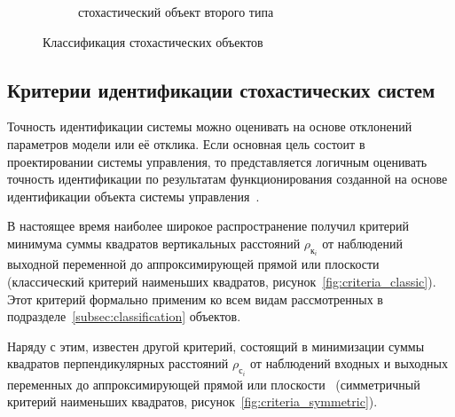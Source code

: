 \begin{figure}[p]
  \vspace{2\baselineskip}
  \begin{subfigure}[b]{\linewidth}
    \centering
    \caption{стохастический объект второго типа}\label{fig:type_second}
  \end{subfigure}

  \vspace{\baselineskip}
  \caption{Классификация стохастических объектов}
\end{figure}

\subsection{Критерии идентификации стохастических систем}

Точность идентификации системы можно оценивать на основе отклонений параметров модели или её отклика.
Если основная цель состоит в проектировании системы управления, то представляется логичным
оценивать точность идентификации по результатам функционирования созданной на основе идентификации
объекта системы управления~\cite{eikhoff_1975}.

В настоящее время наиболее широкое распространение получил критерий
минимума суммы квадратов вертикальных расстояний \( \rho_{\text{к}_i} \) от наблюдений выходной переменной
до аппроксимирующей прямой или плоскости
(классический критерий наименьших квадратов, рисунок~\ref{fig:criteria_classic}).
Этот критерий формально применим ко всем видам рассмотренных в подразделе~\ref{subsec:classification} объектов.

Наряду с этим, известен другой критерий, состоящий в минимизации суммы квадратов
перпендикулярных расстояний \( \rho_{\text{с}_i} \) от наблюдений входных и выходных переменных до
аппроксимирующей прямой или плоскости~\cite{pearson_1901, mukha_2016}
(симметричный критерий наименьших квадратов, рисунок~\ref{fig:criteria_symmetric}).

